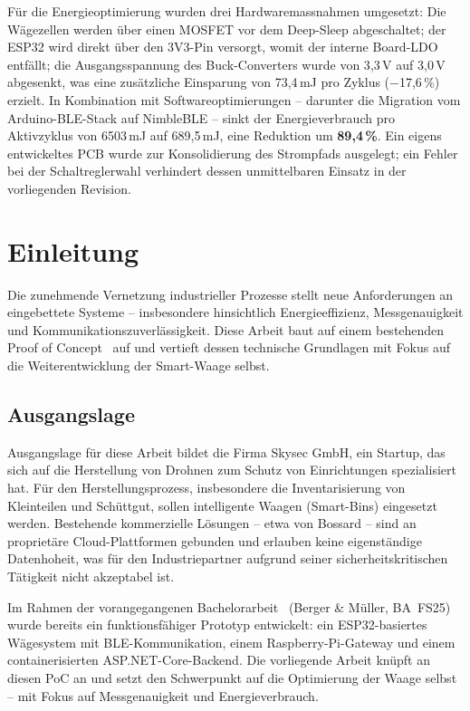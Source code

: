 \documentclass[12pt,a4paper]{article}
\begin{document}
	Für die Energieoptimierung wurden drei Hardwaremassnahmen umgesetzt: Die Wägezellen werden über einen MOSFET vor dem Deep-Sleep abgeschaltet; der ESP32 wird direkt über den 3V3-Pin versorgt, womit der interne Board-LDO entfällt; die Ausgangsspannung des Buck-Converters wurde von 3{,}3\,V auf 3{,}0\,V abgesenkt, was eine zusätzliche Einsparung von 73{,}4\,mJ pro Zyklus ($-$17{,}6\,\%) erzielt.
	In Kombination mit Softwareoptimierungen -- darunter die Migration vom Arduino-BLE-Stack auf NimbleBLE -- sinkt der Energieverbrauch pro Aktivzyklus von 6503\,mJ auf 689{,}5\,mJ, eine Reduktion um \textbf{89{,}4\,\%}.
	Ein eigens entwickeltes PCB wurde zur Konsolidierung des Strompfads ausgelegt; ein Fehler bei der Schaltreglerwahl verhindert dessen unmittelbaren Einsatz in der vorliegenden Revision.

	\newpage
	\tableofcontents
	\newpage

	\section{Einleitung}

	Die zunehmende Vernetzung industrieller Prozesse stellt neue Anforderungen an eingebettete Systeme -- insbesondere hinsichtlich Energieeffizienz, Messgenauigkeit und Kommunikationszuverlässigkeit.
	Diese Arbeit baut auf einem bestehenden Proof of Concept~\cite{vorgaengerarbeit} auf und vertieft dessen technische Grundlagen mit Fokus auf die Weiterentwicklung der Smart-Waage selbst.

	\subsection{Ausgangslage}

	Ausgangslage für diese Arbeit bildet die Firma Skysec GmbH, ein Startup, das sich auf die Herstellung von Drohnen zum Schutz von Einrichtungen spezialisiert hat.
	Für den Herstellungsprozess, insbesondere die Inventarisierung von Kleinteilen und Schüttgut, sollen intelligente Waagen (Smart-Bins) eingesetzt werden.
	Bestehende kommerzielle Lösungen -- etwa von Bossard -- sind an proprietäre Cloud-Plattformen gebunden und erlauben keine eigenständige Datenhoheit, was für den Industriepartner aufgrund seiner sicherheitskritischen Tätigkeit nicht akzeptabel ist.

	Im Rahmen der vorangegangenen Bachelorarbeit~\cite{vorgaengerarbeit} (Berger \& Müller, BA~FS25) wurde bereits ein funktionsfähiger Prototyp entwickelt: ein ESP32-basiertes Wägesystem mit BLE-Kommunikation, einem Raspberry-Pi-Gateway und einem containerisierten ASP.NET-Core-Backend.
	Die vorliegende Arbeit knüpft an diesen PoC an und setzt den Schwerpunkt auf die Optimierung der Waage selbst -- mit Fokus auf Messgenauigkeit und Energieverbrauch.
\end{document}
